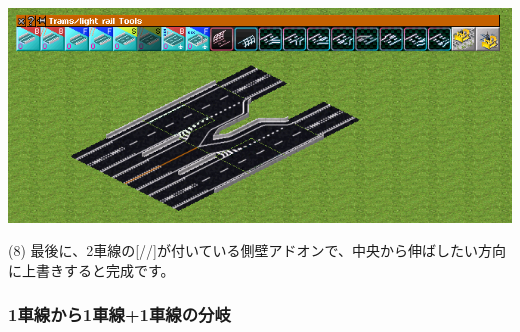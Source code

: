 \documentclass{jarticle}
\begin{document}
  \includegraphics[width = 135mm]{picture/20210214-road-1-9.png}

  (8)
  最後に、2車線の[//]が付いている側壁アドオンで、中央から伸ばしたい方向に上書きすると完成です。

\newpage

\subsubsection{1車線から1車線+1車線の分岐}
\label{sub:1to1and1}
\end{document}
